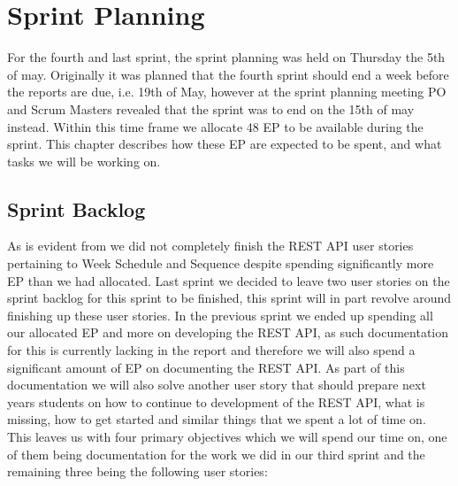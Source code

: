 \chapter{Sprint Planning}\label{chap:Planning4}
For the fourth and last sprint, the sprint planning was held on Thursday the 5th of may.
Originally it was planned that the fourth sprint should end a week before the reports are due, i.e. 19th of May, however at the sprint planning meeting PO and Scrum Masters revealed that the sprint was to end on the 15th of may instead.
Within this time frame we allocate 48 EP to be available during the sprint.
This chapter describes how these EP are expected to be spent, and what tasks we will be working on.

\section{Sprint Backlog}
As is evident from  we did not completely finish the REST API user stories pertaining to Week Schedule and Sequence despite spending significantly more EP than we had allocated.
Last sprint we decided to leave two user stories on the sprint backlog for this sprint to be finished, this sprint will in part revolve around finishing up these user stories.
In the previous sprint we ended up spending all our allocated EP and more on developing the REST API, as such documentation for this is currently lacking in the report and therefore we will also spend a significant amount of EP on documenting the REST API.
As part of this documentation we will also solve another user story that should prepare next years students on how to continue to development of the REST API, what is missing, how to get started and similar things that we spent a lot of time on.
This leaves us with four primary objectives which we will spend our time on, one of them being documentation for the work we did in our third sprint and the remaining three being the following user stories:

\begin{center}
\medskip
{}
\medskip
{}
\end{center}

